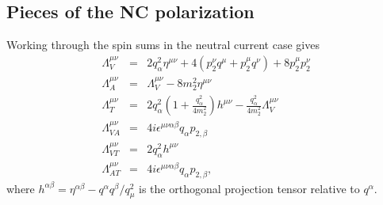 \documentclass[12pt,letter]{article}
\begin{document}
\subsection{Pieces of the NC polarization}
Working through the spin sums in the neutral current case gives
\begin{eqnarray}
\Lambda^{\mu\nu}_V &=& 2 q_\alpha^2 \eta^{\mu \nu} 
+ 4(p_2^\nu q^\mu + p_2^\mu q^\nu) + 8 p_2^\mu p_2^\nu \\
\Lambda^{\mu\nu}_A &=& \Lambda^{\mu\nu}_V - 8 m_2^2 \eta^{\mu \nu} \\
\Lambda^{\mu\nu}_T &=& 2 q_\alpha^2 
\left(1 + \frac{q_\alpha^2}{4 m_2^2} \right)h^{\mu \nu}
-\frac{q_\alpha^2}{4 m_2^2} \Lambda^{\mu \nu}_V \\
\Lambda^{\mu\nu}_{VA} &=& 4 i \epsilon^{\mu \nu \alpha \beta}q_\alpha p_{2,\beta} 
\\
\Lambda^{\mu\nu}_{VT} &=& 2q_\alpha^2 h^{\mu \nu}
\\
\Lambda^{\mu\nu}_{AT} &=& 4 i \epsilon^{\mu \nu \alpha \beta}q_\alpha p_{2,\beta} , 
\end{eqnarray}
where $h^{\alpha \beta} = \eta^{\alpha \beta} - q^\alpha q^\beta/q_\mu^2$ is the
orthogonal projection tensor relative to $q^\alpha$.
\end{document}
